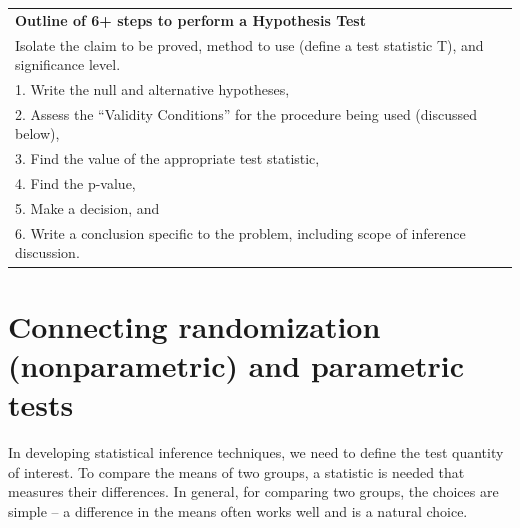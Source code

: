 \documentclass[]{book}
\theoremstyle{definition}
\theoremstyle{definition}
\theoremstyle{remark}
\begin{document}
\begin{longtable}[]{@{}l@{}}
\toprule
\begin{minipage}[t]{0.97\columnwidth}\raggedright\strut
\textbf{Outline of 6+ steps to perform a Hypothesis Test}\strut
\end{minipage}\tabularnewline
\begin{minipage}[t]{0.97\columnwidth}\raggedright\strut
Isolate the claim to be proved, method to use (define a test statistic
T), and significance level.\strut
\end{minipage}\tabularnewline
\begin{minipage}[t]{0.97\columnwidth}\raggedright\strut
1. Write the null and alternative hypotheses,\strut
\end{minipage}\tabularnewline
\begin{minipage}[t]{0.97\columnwidth}\raggedright\strut
2. Assess the ``Validity Conditions'' for the procedure being used
(discussed below),\strut
\end{minipage}\tabularnewline
\begin{minipage}[t]{0.97\columnwidth}\raggedright\strut
3. Find the value of the appropriate test statistic,\strut
\end{minipage}\tabularnewline
\begin{minipage}[t]{0.97\columnwidth}\raggedright\strut
4. Find the p-value,\strut
\end{minipage}\tabularnewline
\begin{minipage}[t]{0.97\columnwidth}\raggedright\strut
5. Make a decision, and\strut
\end{minipage}\tabularnewline
\begin{minipage}[t]{0.97\columnwidth}\raggedright\strut
6. Write a conclusion specific to the problem, including scope of
inference discussion.\strut
\end{minipage}\tabularnewline
\bottomrule
\end{longtable}

\section{Connecting randomization (nonparametric) and parametric
tests}\label{section2-6}

In developing statistical inference techniques, we need to define the
test quantity of interest. To compare the means of two groups, a
statistic is needed that measures their differences. In general, for
comparing two groups, the choices are simple -- a difference in the
means often works well and is a natural choice.
\end{document}
